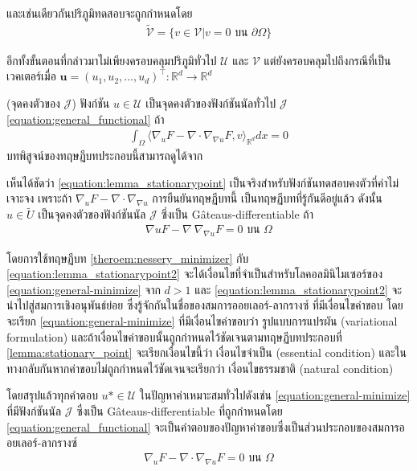 และเช่นเดียวกันปริภูมิทดสอบจะถูกกำหนดโดย
\begin{align}
    \tilde{\mathcal{V}} = \{v \in \mathcal{V} | v = 0 \text{ บน } \partial \Omega \}
\end{align}

อีกทั้งขั้นตอนที่กล่าวมาไม่เพียงครอบคลุมปริภูมิทั่วไป $\mathcal{U}$ และ $\mathcal{V}$ แต่ยังครอบคลุมไปถึงกรณีที่เป็นเวคเตอร์เมื่อ $ \boldsymbol{u} = (u_1,u_2,...,u_d)^\top : \mathbb{R}^{d} \rightarrow \mathbb{R}^{d}$

\begin{Lemma}
    (จุดคงตัวของ $\mathcal{J}$) ฟังก์ชัน $u \in \mathcal{U}$ เป็นจุดคงตัวของฟังก์ชันนัลทั่วไป $\mathcal{J}$ \ref{equation:general_functional} ถ้า
    \begin{align}
        \int_{\Omega} \Big \langle \nabla_u F - \nabla \cdot \nabla_{\nabla u} F,v \Big \rangle_{\mathbb{R}^{d}} dx = 0
        \label{equation:lemma_stationarypoint}
    \end{align}
    \label{lemma:stationary_point}
    บทพิสูจน์ของทฤษฏีบทประกอบนี้สามารถดูได้จาก \cite{ref:general_functional_stationary}
\end{Lemma}

เห็นได้ชัดว่า \ref{equation:lemma_stationarypoint} เป็นจริงสำหรับฟังก์ชันทดสอบคงตัวที่ค่าไม่เจาะจง เพราะถ้า $\nabla_u F - \nabla \cdot \nabla_{\nabla u}$ การยืนยันทฤษฏีบทนี้ เป็นทฤษฏีบทที่รู้กันดีอยู่แล้ว ดังนั้น $u \in \tilde{U}$ เป็นจุดคงตัวของฟังก์ชันนัล $\mathcal{J}$ ซึ่งเป็น G\^{a}teaus-differentiable ถ้า 
\begin{align}
    \nabla u F - \nabla \ \nabla_{\nabla u} F = 0 \text{ บน } \Omega
    \label{equation:lemma_stationarypoint2}
\end{align}

โดยการใช้ทฤษฏีบท \ref{theroem:nessery_minimizer} กับ  \ref{equation:lemma_stationarypoint2} จะได้เงื่อนไขที่จำเป็นสำหรับโลคอลมินิไมเซอร์ของ \ref{equation:general-minimize} จาก $ d > 1$ และ \ref{equation:lemma_stationarypoint2} จะนำไปสู่สมการเชิงอนุพันธ์ย่อย ซึ่งรู้จักกันในชื่อของสมการออยเลอร์-ลากรางซ์ ที่มีเงื่อนไขค่าขอบ โดยจะเรียก \ref{equation:general-minimize} ที่มีเงื่อนไขค่าขอบว่า รูปแบบการแปรผัน (variational formulation) และถ้าเงื่อนไขค่าขอบนั้นถูกกำหนดไว้ชัดเจนตามทฤษฏีบทประกอบที่ \ref{lemma:stationary_point} จะเรียกเงื่อนไขนี้ว่า เงื่อนไขจำเป็น (essential condition) และในทางกลับกันหากค่าขอบไม่ถูกกำหนดไว้ชัดเจนจะเรียกว่า เงื่อนไขธรรมชาติ (natural condition) 

โดยสรุปแล้วทุกคำตอบ $u* \in \mathcal{U}$ ในปัญหาค่าเหมาะสมทั่วไปดังเช่น \ref{equation:general-minimize} ที่มีฟังก์ชันนัล $\mathcal{J}$ ซึ่งเป็น G\^{a}teaus-differentiable ที่ถูกกำหนดโดย \ref{equation:general_functional} จะเป็นคำตอบของปัญหาค่าขอบซึ่งเป็นส่วนประกอบของสมการออยเลอร์-ลากรางซ์
\begin{align*}
    \nabla_u F - \nabla \cdot \nabla_{\nabla u} F = 0 \text{ บน } \Omega
\end{align*}

